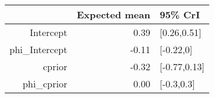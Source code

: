 \begin{tabular}{rrl}
  \hline
 & Expected mean & 95\% CrI \\ 
  \hline
Intercept & 0.39 & [0.26,0.51] \\ 
  phi\_Intercept & -0.11 & [-0.22,0] \\ 
  cprior & -0.32 & [-0.77,0.13] \\ 
  phi\_cprior & 0.00 & [-0.3,0.3] \\ 
   \hline
\end{tabular}

